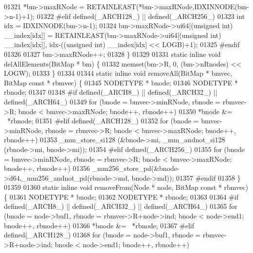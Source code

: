 \begin{DoxyCode}
{01321         *bm->maxRNode = RETAINLEAST(*bm->maxRNode,IDXINNODE(bm->n-1)+1);
01322 \textcolor{preprocessor}{#elif defined(\_ARCH128\_) || defined(\_ARCH256\_)}
01323         \textcolor{keywordtype}{int} idx = IDXINNODE(bm->n-1);
01324         bm->maxRNode->ui64[(\textcolor{keywordtype}{unsigned} int) \_\_index[idx]] = RETAINLEAST(bm->maxRNode->ui64[(\textcolor{keywordtype}{unsigned} \textcolor{keywordtype}{int}) 
      \_\_index[idx]], idx-((\textcolor{keywordtype}{unsigned} int) \_\_index[idx] << LOGB)+1);
01325 \textcolor{preprocessor}{#endif}
01326 
01327         bm->maxRNode++;
01328 \}
01329 
01331 \textcolor{keyword}{static} \textcolor{keyword}{inline} \textcolor{keywordtype}{void} delAllElements(BitMap * bm) \{
01332         memset(bm->R, 0, (bm->nRnodes) << LOGW);
01333 \}
01334 
01344 \textcolor{keyword}{static} \textcolor{keyword}{inline} \textcolor{keywordtype}{void} removeAll(BitMap * bmvec, BitMap \textcolor{keyword}{const} * rbmvec) \{
01345         NODETYPE * bnode;
01346         NODETYPE * rbnode;
01347 
01348 \textcolor{preprocessor}{#if defined(\_ARCH8\_) || defined(\_ARCH32\_) || defined(\_ARCH64\_)}
01349         \textcolor{keywordflow}{for} (bnode = bmvec->minRNode, rbnode = rbmvec->R; bnode < bmvec->maxRNode; bnode++, rbnode++)
01350                 *bnode &= ~*rbnode;
01351 \textcolor{preprocessor}{#elif defined(\_ARCH128\_)}
01352         \textcolor{keywordflow}{for} (bnode = bmvec->minRNode, rbnode = rbmvec->R; bnode < bmvec->maxRNode; bnode++, rbnode++)
01353                 \_mm\_store\_si128 (&bnode->mi, \_mm\_andnot\_si128 (rbnode->mi, bnode->mi));
01354 \textcolor{preprocessor}{#elif defined(\_ARCH256\_)}
01355         \textcolor{keywordflow}{for} (bnode = bmvec->minRNode, rbnode = rbmvec->R; bnode < bmvec->maxRNode; bnode++, rbnode++)
01356                 \_mm256\_store\_pd(&bnode->d64,\_mm256\_andnot\_pd(rbnode->md, bnode->md));
01357 \textcolor{preprocessor}{#endif}
01358 \}
01359 
01360 \textcolor{keyword}{static} \textcolor{keyword}{inline} \textcolor{keywordtype}{void} removeFrom(Node * node, BitMap \textcolor{keyword}{const} * rbmvec) \{
01361         NODETYPE * bnode;
01362         NODETYPE * rbnode;
01363 
01364 \textcolor{preprocessor}{#if defined(\_ARCH8\_) || defined(\_ARCH32\_) || defined(\_ARCH64\_)}
01365         \textcolor{keywordflow}{for} (bnode = node->buf1, rbnode = rbmvec->R+node->ind; bnode < node->end1; bnode++, rbnode++)
01366                 *bnode &= ~*rbnode;
01367 \textcolor{preprocessor}{#elif defined(\_ARCH128\_)}
01368         \textcolor{keywordflow}{for} (bnode = node->buf1, rbnode = rbmvec->R+node->ind; bnode < node->end1; bnode++, rbnode++)
}
\end{DoxyCode}

